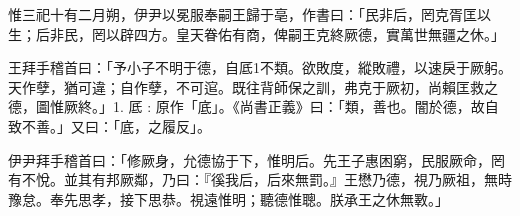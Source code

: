 
\begin{pinyinscope}
惟三祀十有二月朔，伊尹以冕服奉嗣王歸于亳，作書曰：「民非后，罔克胥匡以生；后非民，罔以辟四方。皇天眷佑有商，俾嗣王克終厥德，實萬世無疆之休。」

王拜手稽首曰：「予小子不明于德，自厎1不類。欲敗度，縱敗禮，以速戾于厥躬。天作孽，猶可違；自作孽，不可逭。既往背師保之訓，弗克于厥初，尚賴匡救之德，圖惟厥終。」1. 厎 : 原作「底」。《尚書正義》曰：「類，善也。闇於德，故自致不善。」又曰：「底，之履反」。

伊尹拜手稽首曰：「修厥身，允德協于下，惟明后。先王子惠困窮，民服厥命，罔有不悅。並其有邦厥鄰，乃曰：『徯我后，后來無罰。』王懋乃德，視乃厥祖，無時豫怠。奉先思孝，接下思恭。視遠惟明；聽德惟聰。朕承王之休無斁。」


\end{pinyinscope}